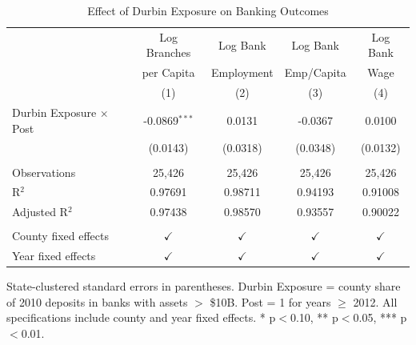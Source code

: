 
\begin{table}[htbp]
   \caption{\label{tab:main} Effect of Durbin Exposure on Banking Outcomes}
   \bigskip
   \centering
   \begin{tabular}{lcccc}
      \toprule
                                     & Log Branches    & Log Bank     & Log Bank     & Log Bank \\
                                     & per Capita      & Employment   & Emp/Capita   & Wage \\   
                                     & (1)                 & (2)              & (3)                   & (4)\\  
      \midrule 
      Durbin Exposure $\times$ Post  & -0.0869$^{***}$     & 0.0131           & -0.0367               & 0.0100\\   
                                     & (0.0143)            & (0.0318)         & (0.0348)              & (0.0132)\\   
       \\
      Observations                   & 25,426              & 25,426           & 25,426                & 25,426\\  
      R$^2$                          & 0.97691             & 0.98711          & 0.94193               & 0.91008\\  
      Adjusted R$^2$                 & 0.97438             & 0.98570          & 0.93557               & 0.90022\\  
       \\
      County fixed effects            & $\checkmark$        & $\checkmark$     & $\checkmark$          & $\checkmark$\\
      Year fixed effects              & $\checkmark$        & $\checkmark$     & $\checkmark$          & $\checkmark$\\   
      \bottomrule
   \end{tabular}
   
   \par \raggedright 
   State-clustered standard errors in parentheses. Durbin Exposure = county share of 2010 deposits in banks with assets $>$ \$10B. Post = 1 for years $\geq$ 2012. All specifications include county and year fixed effects. * p$<$0.10, ** p$<$0.05, *** p$<$0.01.
\end{table}


